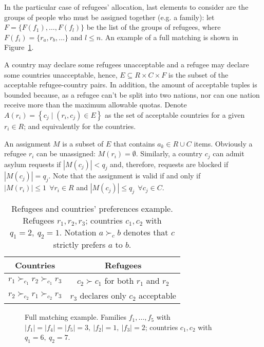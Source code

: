 In the particular case of refugees' allocation, last elements to consider are the groups of people who must be assigned together (e.g. a family): let \(F=\{F(f_1), \dots, F(f_l)\}\) be the list of the groups of refugees, where \(F(f_i) = \{r_a, r_b, \dots\}\) and \(l \leq n\).
An example of a full matching is shown in Figure~\ref{fig:complete_matching}.

A country may declare some refugees unacceptable and a refugee may declare some countries unacceptable, hence, \(E \subseteq R \times C \times F\) is the subset of the acceptable refugee-country pairs. In addition, the amount of acceptable tuples is bounded because, as a refugee can't be split into two nations, nor can one nation receive more than the maximum allowable quotas. Denote \(A \left( r_i \right) = \left\{ c_j \mid \left( r_i, c_j \right) \in E \right\}\) as the set of acceptable countries for a given \(r_i \in R\); and equivalently for the countries.

An assignment \(M\) is a subset of \(E\) that contains \(a_k \in R \cup C\) items. Obviously a refugee \(r_i\) can be unassigned: \(M \left( r_i \right) = \emptyset\). Similarly, a country \(c_j\) can admit asylum requests if \(\left| M \left( c_j \right) \right| < q_j\) and, therefore, requests are blocked if \(\left| M \left( c_j \right) \right| = q_j\). Note that the assignment is valid if and only if \(\left| M \left( r_i \right) \right| \leq 1\ \ \forall r_i \in R\) and \(\left| M \left( c_j \right) \right| \leq q_j\ \ \forall c_j \in C\).

\begin{table}[!htb]
    \centering
    \begin{tabular}{c|c}
        \hline Countries & Refugees \\
        \hline \(r_1 \succ_{c_1} r_2 \succ_{c_1} r_3\) & \(c_2 \succ c_1\) for both \(r_1\) and \(r_2\) \\
        \(r_2 \succ_{c_2} r_1 \succ_{c_2} r_3\) & \(r_3\) declares only \(c_2\) acceptable \\
        \hline
    \end{tabular}
    \caption{Refugees and countries' preferences example. Refugees \(r_1, r_2, r_3\); countries \(c_1, c_2\) with \(q_1 = 2,\ q_2 = 1\). Notation \(a \succ_c b\) denotes that \(c\) strictly prefers \(a\) to \(b\).}
    \label{tab:countries-refugees}
\end{table}

\begin{figure}[!htb]
    \def\svgwidth{\columnwidth}
    
    \caption{Full matching example. Families \(f_1, \dots, f_5\) with \(|f_1|=|f_4|=|f_5|=3,\ |f_2|=1,\ |f_3|=2\); countries \(c_1, c_2\) with \(q_1 = 6,\ q_2 = 7\).}
    \label{fig:complete_matching}
\end{figure}

